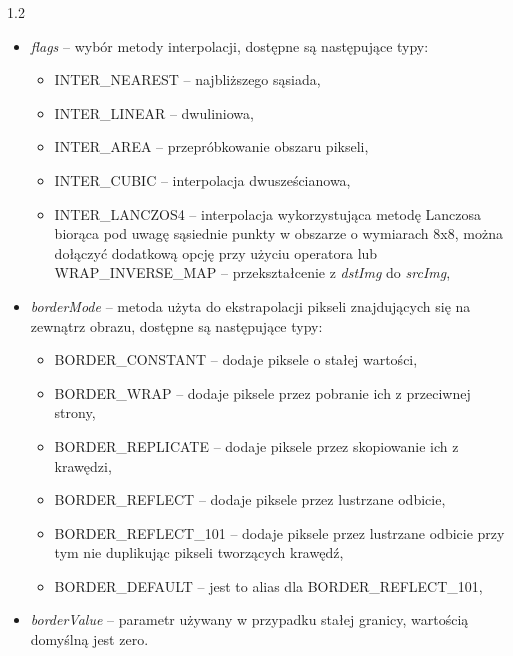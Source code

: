 \documentclass[a4paper,12pt]{article}
\newcommand\spacingInSolemnItemize{1.2}
\begin{document}
                \begin{spacing}{\spacingInSolemnItemize}
                \begin{itemize}
                    \item \textit{flags} -- wybór metody interpolacji, 
                    dostępne są następujące typy:
                    \begin{itemize}
                        \item INTER\_NEAREST -- najbliższego sąsiada, 
                        \item INTER\_LINEAR -- dwuliniowa,
                        \item INTER\_AREA -- przepróbkowanie obszaru pikseli,
                        \item INTER\_CUBIC -- interpolacja dwusześcianowa,
                  
                        \item INTER\_LANCZOS4 -- interpolacja wykorzystująca metodę Lanczosa biorąca pod uwagę sąsiednie punkty w obszarze o wymiarach 8x8,
                    można dołączyć dodatkową opcję przy użyciu operatora lub WRAP\_INVERSE\_MAP -- przekształcenie z \textit{dstImg} do \textit{srcImg},
                    \end{itemize}
                    \item\textit{borderMode} -- metoda użyta do ekstrapolacji pikseli znajdujących się na zewnątrz obrazu, dostępne są następujące typy:
                    
                    \begin{itemize}
                    \item BORDER\_CONSTANT -- dodaje piksele o stałej wartości,
                    \item BORDER\_WRAP -- dodaje piksele przez pobranie ich z przeciwnej strony,
                    \item BORDER\_REPLICATE -- dodaje piksele przez skopiowanie ich z krawędzi,
                    \item BORDER\_REFLECT -- dodaje piksele przez lustrzane odbicie,
                    \item BORDER\_REFLECT\_101 -- dodaje piksele przez lustrzane odbicie przy tym nie duplikując pikseli tworzących krawędź,
                    \item BORDER\_DEFAULT -- jest to alias dla  BORDER\_REFLECT\_101,
                    \end{itemize}
                    \item \textit{borderValue} -- parametr używany w przypadku stałej granicy, wartością domyślną jest zero.  
        		 \end{itemize}
        		 \end{spacing}
        		 
\end{document}
